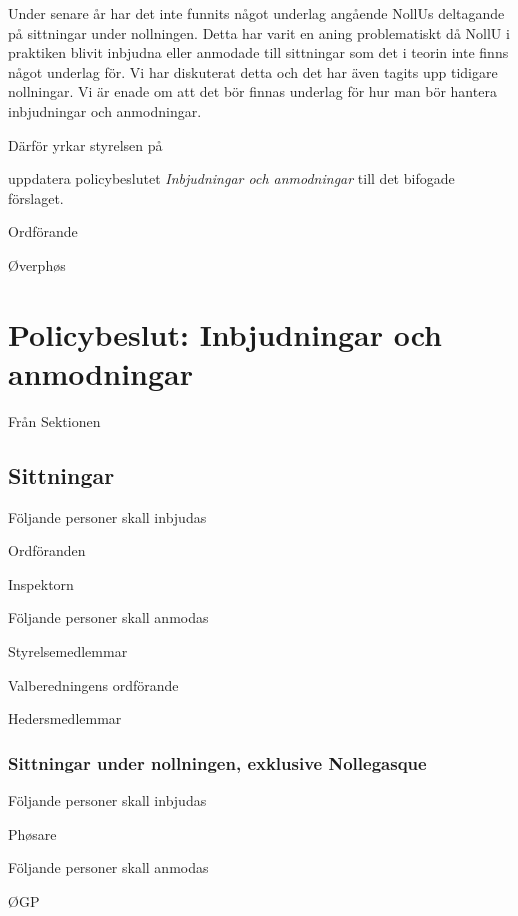 \documentclass[../_main/handlingar.tex]{subfiles}
\begin{document}

Under senare år har det inte funnits något underlag angående NollUs deltagande på sittningar under nollningen. Detta har varit en aning problematiskt då NollU i praktiken blivit inbjudna eller anmodade till sittningar som det i teorin inte finns något underlag för. Vi har diskuterat detta och det har även tagits upp tidigare nollningar. Vi är enade om att det bör finnas underlag för hur man bör hantera inbjudningar och anmodningar. 

Därför yrkar styrelsen på

\begin{attsatser}
    \att uppdatera policybeslutet \emph{Inbjudningar och anmodningar} till det bifogade förslaget.
\end{attsatser}

\begin{signatures}{2}
    \ist
    \signature{\ordf}{Ordförande}
    \signature{Andreas Bennström}{Øverphøs}
\end{signatures}

\newpage
\section*{Policybeslut: Inbjudningar och anmodningar}
Från Sektionen

\subsection*{Sittningar}
Följande personer skall inbjudas
\begin{dashlist}
\item Ordföranden
\item Inspektorn
\end{dashlist}
Följande personer skall anmodas
\begin{dashlist}
\item Styrelsemedlemmar
\item Valberedningens ordförande
\item Hedersmedlemmar
\end{dashlist}

\subsubsection*{Sittningar under nollningen, exklusive Nollegasque}
Följande personer skall inbjudas
\begin{dashlist}
\item Phøsare    
\end{dashlist}
Följande personer skall anmodas
\begin{dashlist}
\item ØGP
\end{dashlist}
\end{document}
